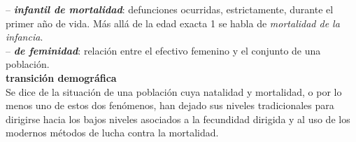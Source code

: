 \begin{multicols}{2}
\vspace{-0.3cm}
-- \textbf{\textit{infantil de mortalidad}}: defunciones ocurridas, estrictamente, durante el primer año de vida. Más allá de la edad exacta 1 se habla de \textit{mortalidad de la infancia}.\\

\vspace{-0.3cm}
-- \textbf{\textit{de feminidad}}: relaci\'on entre el efectivo femenino y el conjunto de una poblaci\'on.\\

\noindent \textbf{\Large{transición demográfica}}\\

\vspace{-0.3cm}
Se dice de la situación de una población cuya natalidad y mortalidad, o por lo menos uno de estos dos fenómenos, han dejado sus niveles tradicionales para dirigirse hacia los bajos niveles asociados a la fecundidad dirigida y al uso de los modernos métodos de lucha contra la mortalidad.\\






\end{multicols}